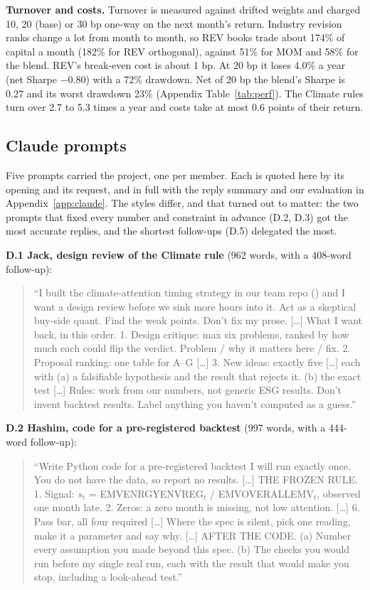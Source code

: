\documentclass[11pt]{article}
\newenvironment{promptbox}{\begin{quote}\small\sloppy\setlength{\parskip}{0.3em}}{\end{quote}}
\begin{document}
\textbf{Turnover and costs.} Turnover is measured against drifted weights and charged 10, 20 (base) or 30 bp one-way on the next month's return. Industry revision ranks change a lot from month to month, so REV books trade about 174\% of capital a month (182\% for REV orthogonal), against 51\% for MOM and 58\% for the blend. REV's break-even cost is about 1 bp. At 20 bp it loses 4.0\% a year (net Sharpe $-0.80$) with a 72\% drawdown. Net of 20 bp the blend's Sharpe is 0.27 and its worst drawdown 23\% (Appendix Table~\ref{tab:perf}). The Climate rules turn over 2.7 to 5.3 times a year and costs take at most 0.6 points of their return.

\subsection{Claude prompts}
\label{sec:prompts}

Five prompts carried the project, one per member. Each is quoted here by its opening and its request, and in full with the reply summary and our evaluation in Appendix~\ref{app:claude}. The styles differ, and that turned out to matter: the two prompts that fixed every number and constraint in advance (D.2, D.3) got the most accurate replies, and the shortest follow-ups (D.5) delegated the most.

\textbf{D.1 Jack, design review of the Climate rule} (962 words, with a 408-word follow-up):
\begin{promptbox}
``I built the climate-attention timing strategy in our team repo () and I want a design review before we sink more hours into it. Act as a skeptical buy-side quant. Find the weak points. Don't fix my prose. [\ldots] What I want back, in this order. 1. Design critique: max six problems, ranked by how much each could flip the verdict. Problem / why it matters here / fix. 2. Proposal ranking: one table for A--G [\ldots] 3. New ideas: exactly five [\ldots] each with (a) a falsifiable hypothesis and the result that rejects it. (b) the exact test [\ldots] Rules: work from our numbers, not generic ESG results. Don't invent backtest results. Label anything you haven't computed as a guess.''
\end{promptbox}

\textbf{D.2 Hashim, code for a pre-registered backtest} (997 words, with a 444-word follow-up):
\begin{promptbox}
``Write Python code for a pre-registered backtest I will run exactly once. You do not have the data, so report no results. [\ldots] THE FROZEN RULE. 1. Signal: $s_t$ = EMVENRGYENVREG$_t$ / EMVOVERALLEMV$_t$, observed one month late. 2. Zeros: a zero month is missing, not low attention. [\ldots] 6. Pass bar, all four required [\ldots] Where the spec is silent, pick one reading, make it a parameter and say why. [\ldots] AFTER THE CODE. (a) Number every assumption you made beyond this spec. (b) The checks you would run before my single real run, each with the result that would make you stop, including a look-ahead test.''
\end{promptbox}
\end{document}
